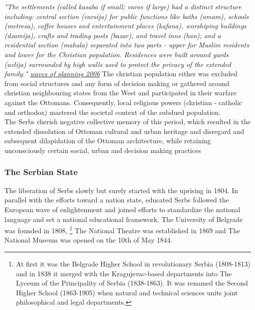 \documentclass[11pt]{report}
\begin{document}
\textit{"The settlements (called kasaba  if  small;  varos  if  large)  had  a  distinct  structure  including:  central section (carsija) for public functions like baths (amam), schools (metresa), coffee houses and entertainment  places  (kafana),  worshiping  buildings  (dzamija),  crafts  and  trading  posts (bazar), and travel inns (han); and a residential section (mahala) separated into two parts - upper for Muslim residents and lower for the Christian population. Residences were built around yards (avlija) surrounded by high walls used to protect the privacy of the extended family." \href{}{waves of planning 2006}}
 The christian population either was excluded from social structures and any form of decision making or gathered around christian neighbouring states from the West and participated in their warfare against the Ottomans. Consequently, local religious powers (christian - catholic and orthodox) mastered the societal context of the subdued population.
\\

The Serbs cherish negative collective memory of this period, which resulted in the extended dissolution of Ottoman cultural and urban heritage and disregard and subsequent dilapidation of the Ottoman architecture, while retaining unconsciously certain social, urban and decision making practices \href{}{\citealt{blagojevic_urban_2009}}

\subsubsection{The Serbian State}

The liberation of Serbs slowly but surely started with the uprising in 1804.
In parallel with the efforts toward a nation state, educated Serbs followed the European wave of enlightenment and joined efforts to standardize the national language and set a national educational framework. The University of Belgrade was founded in 1808,
\footnote{At first it was the Belgrade Higher School in revolutionary Serbia (1808-1813) and in 1838 it merged with the Kragujevac-based departments into The Lyceum of the Principality of Serbia (1838-1863). It was renamed the Second Higher School (1863-1905) when natural and technical sciences units joint philosophical and legal departments.}
The National Theatre was established in 1869 and The National Museum was opened on the 10th of May 1844.
\\
\end{document}

